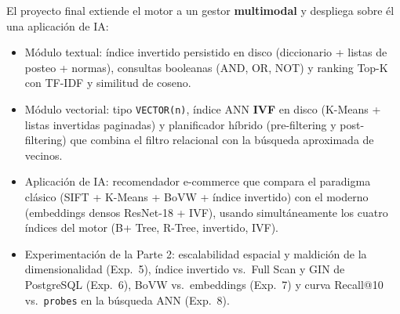 \documentclass[11pt]{article}
\begin{document}
El proyecto final extiende el motor a un gestor
\textbf{multimodal} y despliega sobre él una aplicación de IA:

\begin{itemize}
  \item Módulo textual: índice invertido persistido en disco
        (diccionario + listas de posteo + normas), consultas booleanas
        (AND, OR, NOT) y ranking Top-K con TF-IDF y similitud de coseno.
  \item Módulo vectorial: tipo \texttt{VECTOR(n)}, índice ANN \textbf{IVF}
        en disco (K-Means + listas invertidas paginadas) y planificador
        híbrido (pre-filtering y post-filtering) que combina el filtro
        relacional con la búsqueda aproximada de vecinos.
  \item Aplicación de IA: recomendador e-commerce que compara el paradigma
        clásico (SIFT + K-Means + BoVW + índice invertido) con el moderno
        (embeddings densos ResNet-18 + IVF), usando simultáneamente los
        cuatro índices del motor (B+ Tree, R-Tree, invertido, IVF).
  \item Experimentación de la Parte 2: escalabilidad espacial y maldición
        de la dimensionalidad (Exp.~5), índice invertido vs.\ Full Scan y
        GIN de PostgreSQL (Exp.~6), BoVW vs.\ embeddings (Exp.~7) y curva
        Recall@10 vs.\ \texttt{probes} en la búsqueda ANN (Exp.~8).
\end{itemize}
\end{document}
